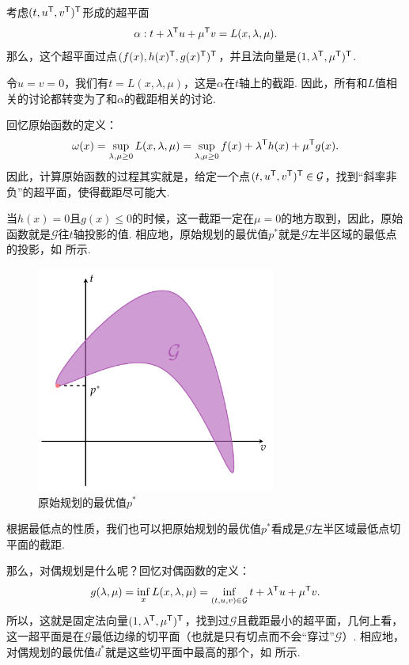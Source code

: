 考虑$(t,u^{\mathsf{T}},v^{\mathsf{T}})^{\mathsf{T}}$形成的超平面
\[\alpha: t+\lambda^{\mathsf{T}} u+\mu^{\mathsf{T}} v= L(x,\lambda,\mu).\]
那么，这个超平面过点$(f(x),h(x)^{\mathsf{T}},g(x)^{\mathsf{T}})^{\mathsf{T}}$，并且法向量是$(1,\lambda^{\mathsf{T}},\mu^{\mathsf{T}})^{\mathsf{T}}$. 

令$u=v=0$，我们有$t=L(x,\lambda,\mu)$，这是$\alpha$在$t$轴上的截距. 因此，所有和$L$值相关的讨论都转变为了和$\alpha$的截距相关的讨论.

回忆原始函数的定义：
\[
\omega(x)=\sup_{\lambda,\mu\geq 0} L(x,\lambda,\mu)=\sup_{\lambda,\mu\geq 0} f(x)+\lambda^{\mathsf{T}} h(x)+\mu^{\mathsf{T}} g(x).
\]
因此，计算原始函数的过程其实就是，给定一个点$(t,u^{\mathsf{T}},v^{\mathsf{T}})^{\mathsf{T}}\in \mathcal{G}$，找到“斜率非负”的超平面，使得截距尽可能大. 

当$h(x)=0$且$g(x)\leq 0$的时候，这一截距一定在$\mu=0$的地方取到，因此，原始函数就是$\mathcal{G}$往$t$轴投影的值. 相应地，原始规划的最优值$p^*$就是$\mathcal{G}$左半区域的最低点的投影，如 所示.

\begin{figure}[htbp]
    \centering
    \includegraphics[width=0.7\textwidth]{figures/duality/duality-primal-p-star.pdf}
    \caption{原始规划的最优值$p^*$}
    \label{fig:duality-primal-p-star}
\end{figure}

根据最低点的性质，我们也可以把原始规划的最优值$p^*$看成是$\mathcal{G}$左半区域最低点切平面的截距.

那么，对偶规划是什么呢？回忆对偶函数的定义：
\[g(\lambda,\mu)=\inf_{x} L(x,\lambda,\mu)=\inf_{(t,u,v)\in\mathcal{G}} t+\lambda^{\mathsf{T}} u+\mu^{\mathsf{T}} v.\]
所以，这就是固定法向量$(1,\lambda^{\mathsf{T}},\mu^{\mathsf{T}})^{\mathsf{T}}$，找到过$\mathcal{G}$且截距最小的超平面，几何上看，这一超平面是在$\mathcal{G}$最低边缘的切平面（也就是只有切点而不会“穿过”$\mathcal{G}$）. 相应地，对偶规划的最优值$d^*$就是这些切平面中最高的那个，如 所示.

